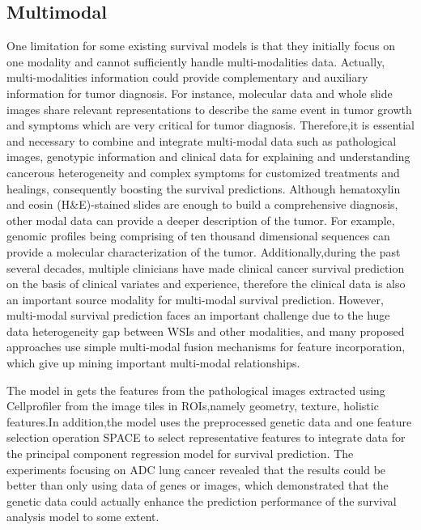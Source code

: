 \documentclass[journal,twoside,web]{ieeecolor}
\begin{document}
\subsection{Multimodal}
One limitation for some existing survival models is that they initially focus on one modality and cannot sufficiently handle multi-modalities data. 
Actually, multi-modalities information could provide complementary and auxiliary information for tumor diagnosis.
For instance, molecular data and whole slide images share relevant representations to describe the same event in tumor growth and symptoms which are very critical for tumor diagnosis.
Therefore,it is essential and necessary to combine and integrate multi-modal data such as pathological images, genotypic information and clinical data for explaining and understanding cancerous heterogeneity and complex symptoms for customized treatments and healings, consequently boosting the survival predictions.
Although hematoxylin and eosin (H\&E)-stained slides are enough to build a comprehensive diagnosis, other modal data can provide a deeper description of the tumor. For example, genomic profiles being comprising of ten thousand dimensional sequences can provide a molecular characterization of the tumor.
Additionally,during the past several decades, multiple clinicians have made clinical cancer survival prediction on the basis of clinical variates and experience, therefore the clinical data is also an important source modality for multi-modal survival prediction.
However, multi-modal survival prediction faces an important challenge due to the huge data heterogeneity gap between WSIs and other modalities, and many proposed approaches use simple multi-modal fusion mechanisms for feature incorporation, which give up mining important multi-modal relationships.

The model in \cite{zhu2016lung} gets the features from the pathological images extracted using Cellprofiler\cite{lamprecht2007cellprofiler} from the image tiles in ROIs,namely geometry, texture, holistic features.In addition,the model uses the preprocessed genetic data and one feature selection operation SPACE\cite{peng2009partial} to select representative features to integrate data for the principal component regression model for survival prediction.
The experiments focusing on ADC lung cancer revealed that the results could be better than only using data of genes or images, which demonstrated that the genetic data could actually enhance the prediction performance of the survival analysis model to some extent.
\end{document}
